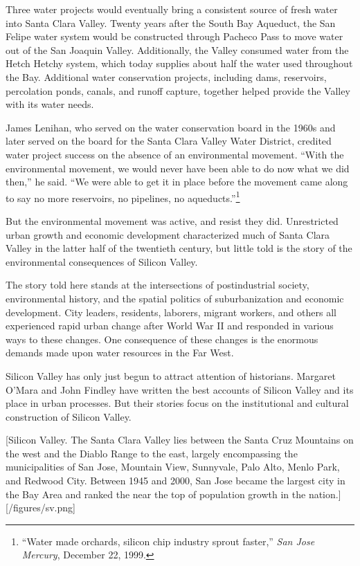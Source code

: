 \documentclass[11pt,article,oneside]{memoir}
\begin{document}
Three water projects would eventually bring a consistent source of fresh
water into Santa Clara Valley. Twenty years after the South Bay
Aqueduct, the San Felipe water system would be constructed through
Pacheco Pass to move water out of the San Joaquin Valley. Additionally,
the Valley consumed water from the Hetch Hetchy system, which today
supplies about half the water used throughout the Bay. Additional water
conservation projects, including dams, reservoirs, percolation ponds,
canals, and runoff capture, together helped provide the Valley with its
water needs.

James Lenihan, who served on the water conservation board in the 1960s
and later served on the board for the Santa Clara Valley Water District,
credited water project success on the absence of an environmental
movement. ``With the environmental movement, we would never have been
able to do now what we did then,'' he said. ``We were able to get it in
place before the movement came along to say no more reservoirs, no
pipelines, no aqueducts.''\footnote{``Water made orchards, silicon chip
  industry sprout faster,'' \emph{San Jose Mercury}, December 22, 1999.}

But the environmental movement was active, and resist they did.
Unrestricted urban growth and economic development characterized much of
Santa Clara Valley in the latter half of the twentieth century, but
little told is the story of the environmental consequences of Silicon
Valley.

The story told here stands at the intersections of postindustrial
society, environmental history, and the spatial politics of
suburbanization and economic development. City leaders, residents,
laborers, migrant workers, and others all experienced rapid urban change
after World War II and responded in various ways to these changes. One
consequence of these changes is the enormous demands made upon water
resources in the Far West.

Silicon Valley has only just begun to attract attention of historians.
Margaret O'Mara and John Findley have written the best accounts of
Silicon Valley and its place in urban processes. But their stories focus
on the institutional and cultural construction of Silicon Valley.

{[}Silicon Valley. The Santa Clara Valley lies between the Santa Cruz
Mountains on the west and the Diablo Range to the east, largely
encompassing the municipalities of San Jose, Mountain View, Sunnyvale,
Palo Alto, Menlo Park, and Redwood City. Between 1945 and 2000, San Jose
became the largest city in the Bay Area and ranked the near the top of
population growth in the nation.{]}{[}/figures/sv.png{]}
\end{document}
